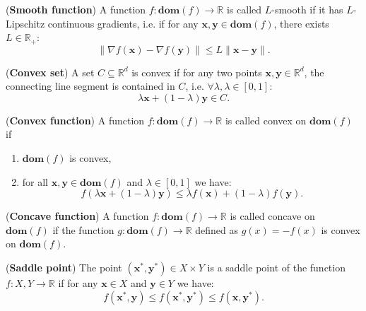 \begin{definition}
    (\textbf{Smooth function}) A function $f : \textbf{dom}(f) \rightarrow \mathbb{R}$ is called $L$-smooth if it has $L$-Lipschitz continuous gradients, i.e. if for any $\bm{x},\bm{y} \in \textbf{dom}(f)$, there exists $L \in \mathbb{R}_+$:
    \[
      \|\nabla f(\bm{x}) -\nabla f(\bm{y})\| \leq L \| \bm{x} - \bm{y} \|.
    \]
\end{definition}

\begin{definition}
    (\textbf{Convex set}) A set $C \subseteq \mathbb{R}^d$ is convex if for any two points $\bm{x},\bm{y} \in \mathbb{R}^d$, the connecting line segment is contained in $C$, i.e. $\forall \lambda, \lambda \in [0,1]$:
    \[  \lambda \bm{x} + (1-\lambda) \bm{y} \in C.\]
\end{definition}

\begin{definition}
    (\textbf{Convex function}) A function $f : \textbf{dom}(f) \rightarrow \mathbb{R}$ is called convex on $\textbf{dom}(f)$ if 
    \begin{enumerate}
        \item $\textbf{dom}(f)$ is convex,
        \item for all $\bm{x}, \bm{y} \in  \textbf{dom}(f)$ and $\lambda \in [0,1]$ we have:
        \[  f(\lambda \bm{x} + (1-\lambda) \bm{y}) \leq \lambda f(\bm{x}) + (1-\lambda) f(\bm{y}). \]
    \end{enumerate}
\end{definition}

\begin{definition}
    (\textbf{Concave function}) A function $f : \textbf{dom}(f) \rightarrow \mathbb{R}$ is called concave on $\textbf{dom}(f)$ if the function $g : \textbf{dom}(f) \rightarrow \mathbb{R}$ defined as $g(x)= -f(x)$ is convex on $\textbf{dom}(f)$.
\end{definition}

\begin{definition}
    \label{def:saddle_point}
    (\textbf{Saddle point}) The point $(\bm{x}^*,\bm{y}^*)\in X \times Y$  is a saddle point of the function $f:X,Y \rightarrow \mathbb{R}$ if for any $\bm{x} \in X$ and $\bm{y} \in Y$ we have:
     \[ f(\bm{x}^*,\bm{y}) \leq f(\bm{x}^*,\bm{y}^*) \leq f(\bm{x},\bm{y}^*). \]
\end{definition}

